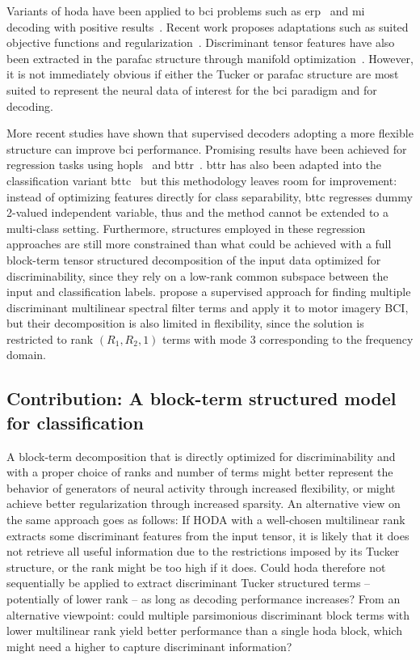 \documentclass[twocolumn]{article}
\begin{document}
Variants of \ac{hoda} have been applied to \ac{bci} problems such as
\ac{erp}~\cite{Onishi2012,Higashi2016} and \ac{mi}~\cite{Liu2015,Cai2021}
decoding with positive results~\cite{Lotte2018}.
Recent work proposes adaptations such as suited objective
functions and regularization~\cite{JamshidiIdaji2017,Jorajuria2022,Aghili2023}.
Discriminant tensor features have also been extracted
in the \ac{parafac} structure through manifold optimization~\cite{Froelich2018}.
However, it is not immediately obvious if either the Tucker or \ac{parafac}
structure are most suited to represent the neural data of interest for the
\ac{bci}
paradigm and for decoding.

More recent studies have shown that supervised decoders adopting a more flexible structure
can improve \ac{bci} performance.
Promising results have been achieved for regression tasks using
\ac{hopls}~\cite{Zhao2012,Camarrone2018} and \ac{bttr}~\cite{Faes2022,Faes2022a}.
\ac{bttr} has also been adapted into the classification variant \ac{bttc}~\cite{Camarrone2021}
but this methodology leaves room for improvement:
instead of optimizing features directly for class separability, \ac{bttc} regresses
dummy 2-valued independent variable, thus and the method
cannot be extended to a multi-class setting.
Furthermore, structures employed in these regression approaches are still more constrained
than what could be achieved with a full block-term tensor structured decomposition of the input data optimized for discriminability, since they rely on a low-rank common subspace
between the input and classification labels.
\textcite{Huang2020} propose a supervised approach for finding multiple discriminant
multilinear spectral filter terms and apply it to motor imagery BCI, but their
decomposition is also limited in flexibility, since the solution is
restricted to rank $(R_1,R_2,1)$ terms with mode 3 corresponding to the frequency domain.

\subsection{Contribution: A block-term structured model for classification}

A block-term decomposition that is directly optimized for discriminability and with a
proper choice of ranks and number of terms might better represent the behavior
of generators of neural activity through increased flexibility, or might
achieve better regularization through increased sparsity.
An alternative view on the same approach goes as follows:
If HODA with a well-chosen multilinear rank extracts some discriminant features
from the input tensor, it is likely that it does not retrieve all useful
information due to the restrictions imposed by its Tucker structure, or the rank
might be too high if it does.
Could \ac{hoda} therefore not sequentially be applied to extract discriminant
Tucker structured terms -- potentially of lower rank -- as long as decoding
performance increases?
From an alternative viewpoint: could multiple parsimonious discriminant block terms with lower
multilinear rank yield better performance than a single \ac{hoda} block, which
might need a higher to capture discriminant information?
\end{document}
